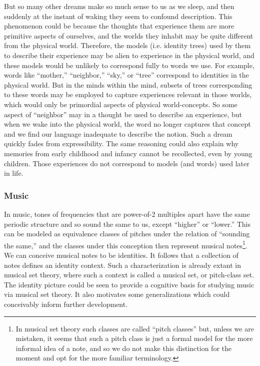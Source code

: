 \documentclass[pra,twocolumn,groupedaddress,10pt]{revtex4}
\theoremstyle{definition}
\begin{document}
But so many other dreams make so much sense to us as we sleep, and then suddenly at the instant of waking they seem to confound description. This phenomenon could be because the thoughts that experience them are more primitive aspects of ourselves, and the worlds they inhabit may be quite different from the physical world. Therefore, the models (i.e. identity trees) used by them to describe their experience may be alien to experience in the physical world, and these models would be unlikely to correspond fully to words we use. For example, words like ``mother,'' ``neighbor,'' ``sky,'' or ``tree'' correspond to identities in the physical world. But in the minds within the mind, subsets of trees corresponding to these words may be employed to capture experiences relevant in those worlds, which would only be primordial aspects of physical world-concepts. So some aspect of ``neighbor'' may in a thought be used to describe an experience, but when we wake into the physical world, the word no longer captures that concept and we find our language inadequate to describe the notion. Such a dream quickly fades from expressibility. The same reasoning could also explain why memories from early childhood and infancy cannot be recollected, even by young children. Those experiences do not correspond to models (and words) used later in life.

\subsubsection{Music} \label{sec:music}

In music, tones of frequencies that are power-of-2 multiples apart have the same periodic structure and so sound the same to us, except ``higher'' or ``lower.'' This can be modeled as equivalence classes of pitches under the relation of ``sounding the same,'' and the classes under this conception then represent musical notes\footnote{In musical set theory such classes are called ``pitch classes'' but, unless we are mistaken, it seems that such a pitch class is just a formal model for the more informal idea of a note, and so we do not make this distinction for the moment and opt for the more familiar terminology.}. We can conceive musical notes to be identities. It follows that a collection of notes defines an identity context. Such a characterization is already extant in musical set theory\cite{musicalsettheory}, where such a context is called a musical set, or pitch-class set. The identity picture could be seen to provide a cognitive basis for studying music via musical set theory. It also motivates some generalizations which could conceivably inform further development.
\end{document}
